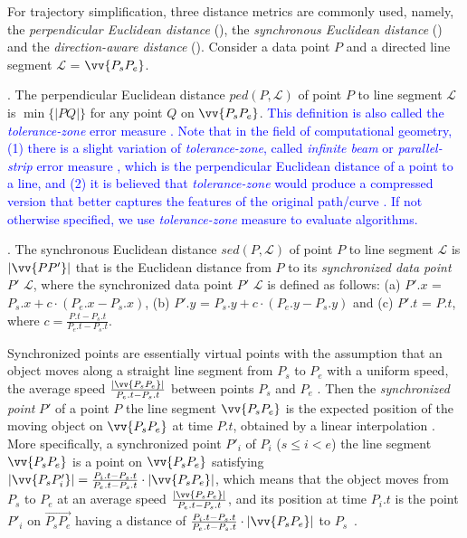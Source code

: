  For trajectory simplification, three distance metrics are commonly used, namely, the \emph{perpendicular Euclidean distance} (\ped), the \emph{synchronous Euclidean distance} \cite{Meratnia:Spatiotemporal} (\sed) and the \emph{direction-aware distance}\cite{Long:Direction, Zhang:Evaluation} (\dad).
%
Consider a data point $P$ and a directed line segment $\mathcal{L}$ = $\vv{P_{s}P_{e}}$.

. The perpendicular Euclidean distance $ped\left(P, \mathcal{L}\right)$ of point $P$ to line segment $\mathcal{L}$ is $\min\{|PQ|\}$ for any point $Q$ on $\vv{P_{s}P_{e}}$.
%
\textcolor{blue}{This definition is also called the \emph{tolerance-zone} error measure \cite{Daescu:metric,Barequet:3D,Chen:Space,Imai:Optimal,Melkman:Optimal}.}
\textcolor{blue}{Note that in the field of computational geometry, (1) there is a slight variation of \emph{tolerance-zone}, called \emph{infinite beam} or \emph{parallel-strip} error measure \cite{Daescu:metric,Chen:Space}, which is the perpendicular Euclidean distance of a point to a line, and (2) it is believed that \emph{tolerance-zone} would produce a compressed version that better captures the features of the original path/curve \cite{Daescu:metric,Barequet:3D,Chen:Space}. If not otherwise specified, we use \emph{tolerance-zone} measure to evaluate algorithms.}
	
. The synchronous Euclidean distance $sed\left(P, \mathcal{L}\right)$ of point $P$ to line segment $\mathcal{L}$ is $|\vv{PP'}|$ that is the Euclidean distance from $P$ to its \textit{synchronized data point} $P'$ \wrt $\mathcal{L}$, where the synchronized data point $P'$ \wrt $\mathcal{L}$ is defined as follows:
(a) $P'.x$ = $P_s.x +  c\cdot\left(P_e.x - P_s.x\right)$,
(b) $P'.y$ = $P_s.y +  c\cdot\left(P_e.y - P_s.y\right)$ and
(c) $P'.t$ = $P.t$, where $c= \frac{P.t-P_s.t}{P_e.t-P_s.t}$.

{Synchronized points are essentially virtual points with the assumption that an object moves along a straight line segment from $P_s$ to $P_e$ with a uniform speed, \ie the average speed $\frac{|\vv{P_sP_e}|}{P_e.t-P_s.t}$ between points $P_s$ and $P_e$ \cite{Cao:Spatio,Lin:Cised}. Then the \emph{synchronized point} $P'$ of a point $P$ \wrt the line segment $\vv{P_sP_e}$ is the expected position of the moving object on $\vv{P_sP_e}$ at time $P.t$, obtained by a linear interpolation \cite{Cao:Spatio}. More specifically, a synchronized point $P'_i$ of $P_i$ ($s\le i < e$) \wrt the line segment $\vv{P_sP_e}$ is a point on $\vv{P_sP_{e}}$ satisfying ${|\vv{P_sP'_i}|} = \frac{P_i.t - P_s.t}{P_e.t - P_s.t}\cdot {|\vv{P_sP_e}|}$, which means that the object moves from $P_s$ to $P_e$ at an average speed $\frac{|\vv{P_sP_e}|}{P_e.t-P_s.t}$, and its position at time $P_i.t$ is the point $P'_i$ on $\overrightarrow{P_sP_{e}}$ having a distance of $\frac{P_i.t - P_s.t}{P_e.t - P_s.t}\cdot|\vv{P_sP_e}|$ to $P_s$~\cite{Cao:Spatio, Lin:Cised,Meratnia:Spatiotemporal, Chen:Fast, Zhang:Evaluation}.}

